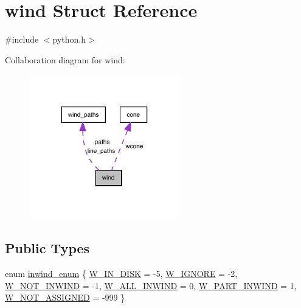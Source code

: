 \hypertarget{structwind}{}\section{wind Struct Reference}
\label{structwind}


{\ttfamily \#include $<$python.\+h$>$}



Collaboration diagram for wind\+:
\nopagebreak
\begin{figure}[H]
\begin{center}
\leavevmode
\includegraphics[width=186pt]{structwind__coll__graph}
\end{center}
\end{figure}
\subsection*{Public Types}
\begin{DoxyCompactItemize}
\item 
enum \hyperlink{structwind_a0cb1b3175908a106ae86ce77d5d2a8a4}{inwind\+\_\+enum} \{ \newline
\hyperlink{structwind_a0cb1b3175908a106ae86ce77d5d2a8a4adff4f483f25869269ceb015460e67efa}{W\+\_\+\+I\+N\+\_\+\+D\+I\+SK} = -\/5, 
\hyperlink{structwind_a0cb1b3175908a106ae86ce77d5d2a8a4a3561a8850a0741aa1587b088f9a9c79e}{W\+\_\+\+I\+G\+N\+O\+RE} = -\/2, 
\hyperlink{structwind_a0cb1b3175908a106ae86ce77d5d2a8a4a41a5f993290a4f10c2fa91e19c83d666}{W\+\_\+\+N\+O\+T\+\_\+\+I\+N\+W\+I\+ND} = -\/1, 
\hyperlink{structwind_a0cb1b3175908a106ae86ce77d5d2a8a4a370a5c4e682d17730e1d4e6765ba9d24}{W\+\_\+\+A\+L\+L\+\_\+\+I\+N\+W\+I\+ND} = 0, 
\newline
\hyperlink{structwind_a0cb1b3175908a106ae86ce77d5d2a8a4a6b32df2f7211ffd13ad86080608a48fc}{W\+\_\+\+P\+A\+R\+T\+\_\+\+I\+N\+W\+I\+ND} = 1, 
\hyperlink{structwind_a0cb1b3175908a106ae86ce77d5d2a8a4a26eb6750b38353d7bb17eee540b0cd25}{W\+\_\+\+N\+O\+T\+\_\+\+A\+S\+S\+I\+G\+N\+ED} = -\/999
 \}
\end{DoxyCompactItemize}
